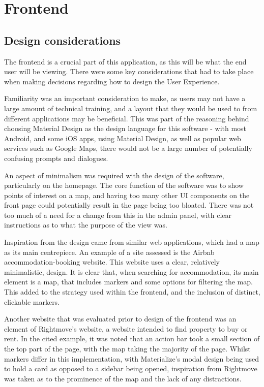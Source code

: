\section{Frontend}
\label{sec:frontend}

\subsection{Design considerations}

The frontend is a crucial part of this application, as this will be what the end user will be viewing. There were some key considerations that had to take place when making decisions regarding how to design the User Experience.

Familiarity was an important consideration to make, as users may not have a large amount of technical training, and a layout that they would be used to from different applications may be beneficial. This was part of the reasoning behind choosing Material Design as the design language for this software - with most Android, and some iOS apps, using Material Design, as well as popular web services such as Google Maps, there would not be a large number of potentially confusing prompts and dialogues.

An aspect of minimalism was required with the design of the software, particularly on the homepage. The core function of the software was to show points of interest on a map, and having too many other UI components on the front page could potentially result in the page being too bloated. There was not too much of a need for a change from this in the admin panel, with clear instructions as to what the purpose of the view was.

Inspiration from the design came from similar web applications, which had a map as its main centrepiece. An example of a site assessed is the Airbnb accommodation-booking website\cite{airbnb}. This website uses a clear, relatively minimalistic, design. It is clear that, when searching for accommodation, its main element is a map, that includes markers and some options for filtering the map. This added to the strategy used within the frontend, and the inclusion of distinct, clickable markers.

Another website that was evaluated prior to design of the frontend was an element of Rightmove's website, a website intended to find property to buy or rent\cite{rightmove}. In the cited example, it was noted that an action bar took a small section of the top part of the page, with the map taking the majority of the page. Whilst markers differ in this implementation, with Materialize's modal design being used to hold a card as opposed to a sidebar being opened, inspiration from Rightmove was taken as to the prominence of the map and the lack of any distractions.

